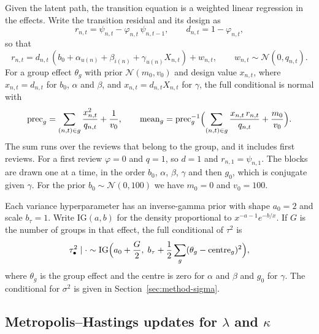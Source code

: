 Given the latent path, the transition equation is a weighted linear regression in the effects. Write
the transition residual and its design as
\begin{equation}\label{eq:resid}
  r_{n,t} = \psi_{n,t} - \varphi_{n,t}\,\psi_{n,t-1}, \qquad d_{n,t} = 1 - \varphi_{n,t},
\end{equation}
so that
\begin{equation}\label{eq:resid-reg}
  r_{n,t} = d_{n,t}\,(b_0 + \alpha_{u(n)} + \beta_{i(n)} + \gamma_{u(n)} X_{n,t}) + w_{n,t},
  \qquad w_{n,t} \sim \mathcal N(0, q_{n,t}).
\end{equation}
For a group effect $\theta_g$ with prior $\mathcal N(m_0, v_0)$ and design value $x_{n,t}$, where $x_{n,t} = d_{n,t}$ for $b_0$, $\alpha$ and $\beta$, and $x_{n,t} = d_{n,t}X_{n,t}$ for $\gamma$, the full
conditional is normal with
\begin{equation}\label{eq:prec}
  \operatorname{prec}_g = \sum_{(n,t) \in g}\frac{x_{n,t}^2}{q_{n,t}} + \frac{1}{v_0},
  \qquad
  \operatorname{mean}_g = \operatorname{prec}_g^{-1}\Bigl(\sum_{(n,t) \in g}\frac{x_{n,t}\,r_{n,t}}{q_{n,t}} + \frac{m_0}{v_0}\Bigr).
\end{equation}
The sum runs over the reviews that belong to the group, and it includes first reviews. For a first review $\varphi = 0$ and $q = 1$, so $d = 1$ and $r_{n,1} = \psi_{n,1}$. The blocks are drawn one at a time, in the
order $b_0$, $\alpha$, $\beta$, $\gamma$ and then $g_0$, which is conjugate given $\gamma$. For the
prior $b_0 \sim \mathcal N(0, 100)$ we have $m_0 = 0$ and $v_0 = 100$.

Each variance hyperparameter has an inverse-gamma prior with shape $a_0 = 2$ and scale $b_\tau = 1$. Write
$\mathrm{IG}(a, b)$ for the density proportional to $x^{-a-1}e^{-b/x}$. If $G$ is the number of
groups in that effect, the full conditional of $\tau^2$ is
\begin{equation}\label{eq:tau}
  \tau^2_\bullet \mid \cdot \sim \mathrm{IG}\Bigl(a_0 + \frac{G}{2},\; b_\tau + \frac{1}{2}\sum_{g}(\theta_g - \text{centre}_g)^2\Bigr),
\end{equation}
where $\theta_g$ is the group effect and the centre is zero for $\alpha$ and $\beta$ and $g_0$ for
$\gamma$. The conditional for $\sigma^2$ is given in Section~\ref{sec:method-sigma}.

\subsection{Metropolis--Hastings updates for \texorpdfstring{$\lambda$}{lambda} and \texorpdfstring{$\kappa$}{kappa}}
\label{sec:method-mh}

